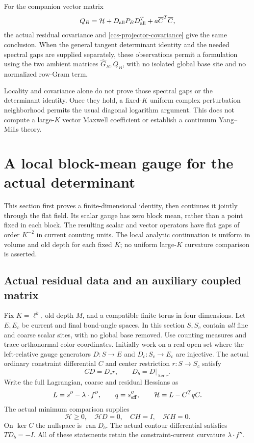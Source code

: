 \documentclass[11pt]{article}
\theoremstyle{remark}
\begin{document}
For the companion vector matrix
\[
 Q_B=\mathcal H+D_{\rm all}P_BD_{\rm all}^T
                         +a\overline C^T\overline C,
\]
the actual residual covariance and
\eqref{ccs-projector-covariance} give the same conclusion.
When the general tangent determinant identity and the needed
spectral gaps are supplied separately, these observations
permit a formulation using the two ambient matrices
\(\widehat G_B,Q_B\), with no isolated global base site and
no normalized row-Gram term.

Locality and covariance alone do not prove those spectral gaps
or the determinant identity. Once they hold, a fixed-\(K\)
uniform complex perturbation neighborhood permits the usual
diagonal logarithm argument. This does not compute a
large-\(K\) vector Maxwell coefficient or establish a
continuum Yang--Mills theory.


\section{A local block-mean gauge for the actual determinant}
\label{pql-section}

This section first proves a finite-dimensional identity, then continues
it jointly through the flat field. Its scalar gauge has zero block mean,
rather than a point fixed in each block. The resulting scalar and vector
operators have flat gaps of order $K^{-2}$ in current counting units.
The local analytic continuation is uniform in volume and old depth for
each fixed $K$; no uniform large-$K$ curvature comparison is asserted.

\subsection{Actual residual data and an auxiliary coupled matrix}
\label{pql-actual-data}

Fix $K=\ell^k$, old depth $M$, and a compatible finite torus in four
dimensions. Let $E,E_c$ be current and final bond-angle spaces. In this
section $S,S_c$ contain \emph{all} fine and coarse scalar sites, with no
global base removed. Use counting measures and trace-orthonormal color
coordinates. Initially work on a real open set where the left-relative
gauge generators $D:S\to E$ and $D_c:S_c\to E_c$ are injective.
The actual ordinary constraint differential $C$ and center restriction
$r:S\to S_c$ satisfy
\begin{equation}
 CD=D_cr,\qquad D_b=D|_{\ker r}.
 \label{pql-ordinary-intertwining}
\end{equation}
Write the full Lagrangian, coarse and residual Hessians as
\begin{equation}
 L=s''-\lambda\cdot f'',\qquad q=s_{\rm eff}'',\qquad
 \mathcal H=L-C^TqC.
 \label{pql-residual}
\end{equation}
The actual minimum comparison supplies
\begin{equation}
 \mathcal H\ge0,\quad \mathcal H D=0,\quad CH=I,\quad
 \mathcal H H=0.
 \label{pql-minimum-identities}
\end{equation}
On $\ker C$ the nullspace is $\operatorname{ran}D_b$.
The actual contour differential satisfies $TD_b=-I$.
All of these statements retain the constraint-current curvature
$\lambda\cdot f''$.
\end{document}
